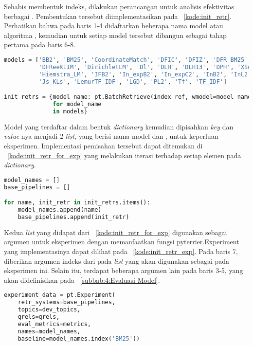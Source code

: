 Sehabis membentuk indeks, dilakukan perancangan \pipeline{} untuk analisis efektivitas berbagai \base{} \retriever{}. Pembentukan \pipeline{} tersebut diimplementasikan pada \kode{}~\ref{kode:init_retr}. Perhatikan bahwa pada baris 1-4 didaftarkan beberapa nama model atau algoritma \base{} \retrieval{}, kemudian untuk setiap model tersebut dibangun \pipeline{} \retrieval{} sebagai tahap \ranking{} pertama pada baris 6-8.
\begin{lstlisting}[language=Python, caption={Pembentukan \textit{Base retriever pipelines}}, label={kode:init_retr}]
models = ['BB2', 'BM25', 'CoordinateMatch', 'DFIC', 'DFIZ', 'DFR_BM25', 'DFRee',
          'DFReeKLIM', 'DirichletLM', 'Dl', 'DLH', 'DLH13', 'DPH', 'XSqrA_M',
          'Hiemstra_LM', 'IFB2', 'In_expB2', 'In_expC2', 'InB2', 'InL2',
          'Js_KLs', 'LemurTF_IDF', 'LGD', 'PL2', 'Tf', 'TF_IDF']

init_retrs = {model_name: pt.BatchRetrieve(index_ref, wmodel=model_name)
              for model_name
              in models}
\end{lstlisting}

Model yang terdaftar dalam bentuk \textit{dictionary} kemudian dipisahkan \textit{key} dan \textit{value}-nya menjadi 2 \textit{list}, yang berisi nama model dan \pipeline{}, untuk keperluan eksperimen\retrieval{}. Implementasi pemisahan tersebut dapat ditemukan di \kode{}~\ref{kode:init_retr_for_exp} yang melakukan iterasi terhadap setiap elemen pada \textit{dictionary}.
\begin{lstlisting}[language=Python, caption={Persiapan \textit{base retriever pipelines} untuk Eksperimen}, label={kode:init_retr_for_exp}]
model_names = []
base_pipelines = []

for name, init_retr in init_retrs.items():
    model_names.append(name)
    base_pipelines.append(init_retr)
\end{lstlisting}

Kedua \textit{list} yang didapat dari \kode{}~\ref{kode:init_retr_for_exp} digunakan sebagai argumen untuk eksperimen dengan memanfaatkan fungsi pyterrier.Experiment yang implementasinya dapat dilihat pada \kode{}~\ref{kode:init_retr_exp}. Pada baris 7, diberikan argumen indeks dari \obm{} pada \textit{list} yang akan digunakan sebagai \baseline{} pada eksperimen ini. Selain itu, terdapat beberapa argumen lain pada baris 3-5, yang akan didefinisikan pada \subbab{}~\ref{subbab:4:Evaluasi Model}.
\begin{lstlisting}[language=Python, caption={Eksperimen berbagai model atau algoritma \base{} \retrieval{}}, label={kode:init_retr_exp}]
experiment_data = pt.Experiment(
    retr_systems=base_pipelines,
    topics=dev_topics,
    qrels=qrels,
    eval_metrics=metrics,
    names=model_names,
    baseline=model_names.index('BM25'))
\end{lstlisting}


